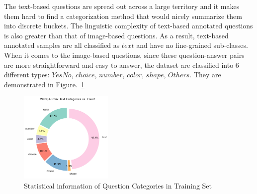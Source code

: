 \documentclass[nohyperref]{article}
\theoremstyle{plain}
\theoremstyle{definition}
\theoremstyle{remark}
\begin{document}
    The text-based questions are spread out across a large territory and it makes them hard to find a categorization method that would nicely summarize them into discrete buckets. The linguistic complexity of text-based annotated questions is also greater than that of image-based questions. As a result, text-based annotated samples are all classified as $\mathit{text}$ and have no fine-grained sub-classes. When it comes to the image-based questions, since these question-answer pairs are more straightforward and easy to answer, the dataset are classified into 6 different types: $\mathit{YesNo}$, $\mathit{choice}$, $\mathit{number}$, $\mathit{color}$, $\mathit{shape}$, $\mathit{Others}$. They are demonstrated in Figure.~\ref{fig:qcate_pie}

    \begin{figure}[h]
        \center
        \includegraphics[width=0.4\textwidth]{img/train_textCat2count.png}
        \caption{Statistical information of Question Categories in Training Set}
        \label{fig:qcate_pie}
    \end{figure}
\end{document}
